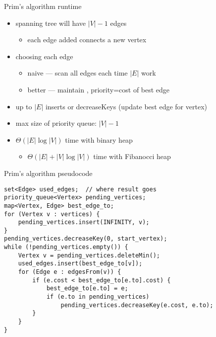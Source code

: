 \begin{frame}{Prim's algorithm runtime}
\begin{itemize}
    \item spanning tree will have $|V|-1$ edges
        \begin{itemize}
        \item each edge added connects a new vertex
        \end{itemize}
    \item choosing each edge 
        \begin{itemize}
        \item naive --- scan all edges each time $|E|$ work
        \item better --- maintain , priority=cost of best edge
        \end{itemize}
    \vspace{.5cm}
    \item up to $|E|$ inserts or decreaseKeys (update best edge for vertex)
    \item max size of priority queue: $|V|-1$
    \item $\Theta(|E|\log|V|)$ time with binary heap
        \begin{itemize}
            \item $\Theta(|E|+|V|\log|V|)$ time with Fibanocci heap
        \end{itemize}
\end{itemize}
\end{frame}


\begin{frame}[fragile,label=primPseudo]{Prim's algorithm pseudocode}
\lstset{language=C++,style=smaller}
\begin{lstlisting}
set<Edge> used_edges;  // where result goes
priority_queue<Vertex> pending_vertices;
map<Vertex, Edge> best_edge_to;
for (Vertex v : vertices) {
    pending_vertices.insert(INFINITY, v);
}
pending_vertices.decreaseKey(0, start_vertex);
while (!pending_vertices.empty()) {
    Vertex v = pending_vertices.deleteMin();
    used_edges.insert(best_edge_to[v]);
    for (Edge e : edgesFrom(v)) {
        if (e.cost < best_edge_to[e.to].cost) {
            best_edge_to[e.to] = e;
            if (e.to in pending_vertices)
                pending_vertices.decreaseKey(e.cost, e.to);
        }
    }
}
\end{lstlisting}
\end{frame}
